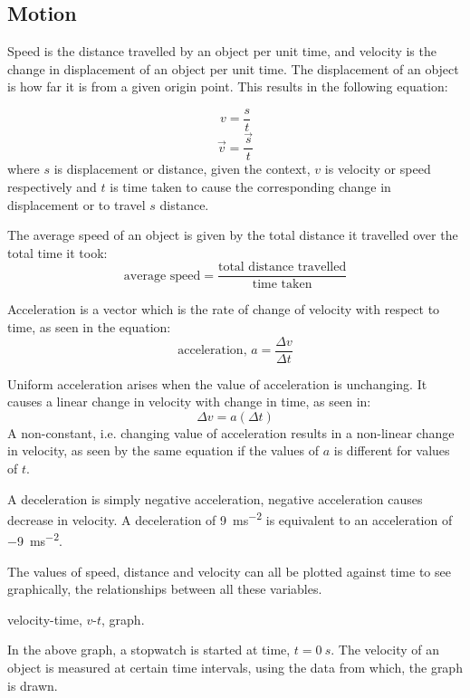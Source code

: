 \subsection{Motion}
Speed is the distance travelled by an object per unit time, and velocity is the change in 
displacement of an object per unit time. The displacement of an object is how far it is from a
given origin point. This results in the following equation:

$$ v = \frac{s}{t} $$
$$ \vec{v} = \frac{\vec{s}}{t} $$
where $s$ is displacement or distance, given the context, $v$ is velocity or speed respectively and
$t$ is time taken to cause the corresponding change in displacement or to travel $s$ distance.

The average speed of an object is given by the total distance it travelled over the total time it
took:
$$ \textrm{average speed} = \frac{\textrm{total distance travelled}}{\textrm{time taken}} $$

Acceleration is a vector which is the rate of change of velocity with respect to time, as seen in 
the equation:
$$\textrm{acceleration, } a = \frac{\Delta v}{\Delta t} $$

Uniform acceleration arises when the value of acceleration is unchanging. It causes a linear 
change in velocity with change in time, as seen in:
$$ \Delta v = a (\Delta t) $$
A non-constant, i.e. changing value of acceleration results in a non-linear change in velocity, as
seen by the same equation if the values of $a$ is different for values of $t$.

A deceleration is simply negative acceleration, negative acceleration causes decrease in velocity.
A deceleration of \SI{9}{ms^{-2}} is equivalent to an acceleration of \SI{-9}{ms^{-2}}.

The values of speed, distance and velocity can all be plotted against time to see graphically, the
relationships between all these variables.

\begin{center}

velocity-time, $v$-$t$, graph.
\end{center}
In the above graph, a stopwatch is started at time, $t = \SI{0}{s}$. The velocity of an object
is measured at certain time intervals, using the data from which, the graph is drawn. 

